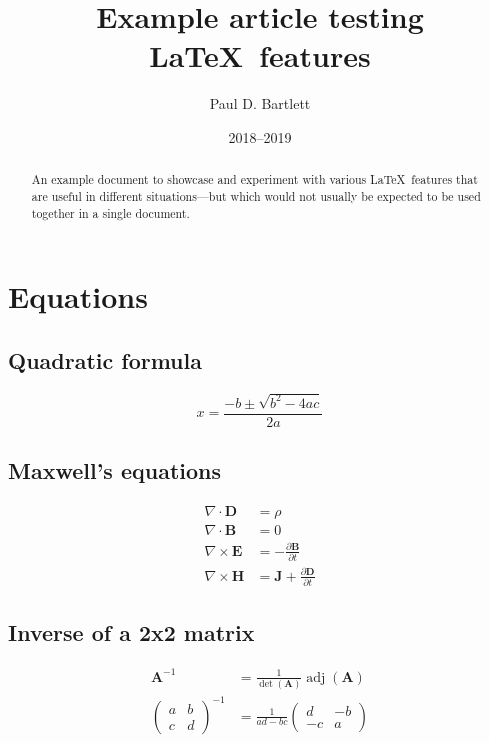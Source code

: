 \documentclass[11pt,a4paper]{article}
\title{Example article testing \LaTeX\ features}
\author{Paul D. Bartlett}
\date{2018--2019}
\begin{document}
\maketitle

\begin{abstract}
An example document to showcase and experiment with various \LaTeX\ features that
are useful in different situations---but which would not usually be expected to be used
together in a single document.
\end{abstract}

\tableofcontents
\listoftables
\listoffigures

\section{Equations}

\subsection{Quadratic formula}
\begin{equation}
x = \frac{-b \pm \sqrt{b^2 - 4ac}}{2a}
\end{equation}

\subsection{Maxwell's equations}
\begin{align}
\nabla \cdot \mathbf{D} &= \rho\\
\nabla \cdot \mathbf{B} &= 0\\
\nabla \times \mathbf{E} &= -\frac{\partial \mathbf{B}} {\partial t}\\
\nabla \times \mathbf{H} &= \mathbf{J} + \frac{\partial \mathbf{D}} {\partial t}
\end{align}

\subsection{Inverse of a 2x2 matrix}
\begin{align}
\mathbf{A}^{-1} &= \frac{1}{\det(\mathbf{A})} \operatorname{adj}(\mathbf{A})\\
\begin{pmatrix}
a & b\\
c & d
\end{pmatrix}^{-1}
&=
\frac{1}{ad-bc}
\begin{pmatrix}
d & -b\\
-c & a
\end{pmatrix}
\end{align}
\end{document}
